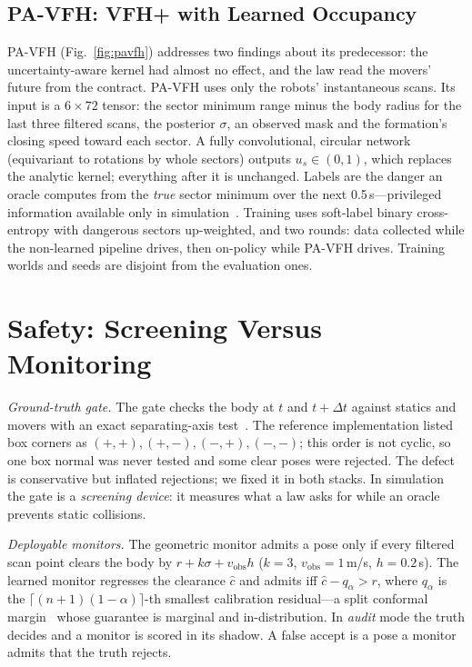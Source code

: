 \documentclass[journal]{IEEEtran}
\newcommand{\pavfh}{PA-VFH}
\begin{document}
\subsection{\pavfh{}: VFH+ with Learned Occupancy}
\pavfh{} (Fig.~\ref{fig:pavfh}) addresses two findings about its predecessor:
the uncertainty-aware kernel had almost no effect, and the law read the
movers' future from the contract. \pavfh{} uses only the robots' instantaneous
scans. Its input is a $6\times72$ tensor: the sector minimum range minus the
body radius for the last three filtered scans, the posterior $\sigma$, an
observed mask and the formation's closing speed toward each sector. A fully
convolutional, circular network (equivariant to rotations by whole sectors)
outputs $u_s\in(0,1)$, which replaces the analytic kernel; everything after it
is unchanged. Labels are the danger an oracle computes from the \emph{true}
sector minimum over the next 0.5\,s---privileged information available only in
simulation~\cite{chen2020}. Training uses soft-label binary cross-entropy with
dangerous sectors up-weighted, and two rounds: data collected while the
non-learned pipeline drives, then on-policy while \pavfh{} drives. Training
worlds and seeds are disjoint from the evaluation ones.

\section{Safety: Screening Versus Monitoring}
\textit{Ground-truth gate.} The gate checks the body at $t$ and $t+\Delta t$
against statics and movers with an exact separating-axis test~\cite{gottschalk1996}.
The reference implementation listed box corners as $(+,+),(+,-),(-,+),(-,-)$; this
order is not cyclic, so one box normal was never tested and some clear poses
were rejected. The defect is conservative but inflated rejections; we fixed it
in both stacks. In simulation the gate is a \emph{screening device}: it
measures what a law asks for while an oracle prevents static collisions.

\textit{Deployable monitors.} The geometric monitor admits a pose only if every
filtered scan point clears the body by $r+k\sigma+v_{\mathrm{obs}}h$
($k=3$, $v_{\mathrm{obs}}=1$\,m/s, $h=0.2$\,s). The learned monitor regresses
the clearance $\hat c$ and admits iff $\hat c-q_\alpha>r$, where $q_\alpha$ is
the $\lceil(n+1)(1-\alpha)\rceil$-th smallest calibration residual---a split
conformal margin~\cite{vovk2005,angelopoulos2021} whose guarantee is marginal and
in-distribution. In \emph{audit} mode the truth decides and a monitor is scored
in its shadow. A false accept is a pose a monitor admits that the truth rejects.
\end{document}
